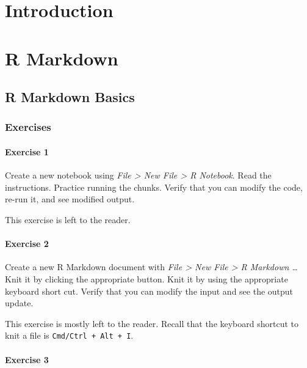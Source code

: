 \documentclass[]{book}
\theoremstyle{definition}
\theoremstyle{definition}
\theoremstyle{definition}
\theoremstyle{remark}
\begin{document}
\hypertarget{communicate-intro}{%
\chapter{Introduction}\label{communicate-intro}}

\hypertarget{r-markdown}{%
\chapter{R Markdown}\label{r-markdown}}

\hypertarget{r-markdown-basics}{%
\section{R Markdown Basics}\label{r-markdown-basics}}

\hypertarget{exercises-6}{%
\subsection{Exercises}\label{exercises-6}}

\hypertarget{exercise-1-65}{%
\subsubsection{Exercise 1}\label{exercise-1-65}}

Create a new notebook using \emph{File \textgreater{} New File
\textgreater{} R Notebook}. Read the instructions. Practice running the
chunks. Verify that you can modify the code, re-run it, and see modified
output.

This exercise is left to the reader.

\hypertarget{exercise-2-64}{%
\subsubsection{Exercise 2}\label{exercise-2-64}}

Create a new R Markdown document with \emph{File \textgreater{} New File
\textgreater{} R Markdown \ldots{}} Knit it by clicking the appropriate
button. Knit it by using the appropriate keyboard short cut. Verify that
you can modify the input and see the output update.

This exercise is mostly left to the reader. Recall that the keyboard
shortcut to knit a file is \texttt{Cmd/Ctrl\ +\ Alt\ +\ I}.

\hypertarget{exercise-3-48}{%
\subsubsection{Exercise 3}\label{exercise-3-48}}
\end{document}
